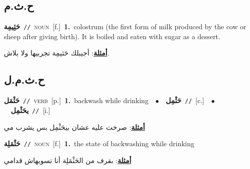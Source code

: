 \documentclass[10pt,a4paper,twoside]{article} %
\begin{document}
\begin{multicols}{2}
\vspace{-3mm}
\subsection*{\color{blue}\foreignlanguage{arabic}{ح.ث.م}\color{blue}{}} 

{\setlength\topsep{0pt}\textbf{\foreignlanguage{arabic}{حَثِيمِة}}\ {\color{gray}\texttt{//}\color{black}}\ \textsc{noun}\ [f.]\ \textbf{1.}~colostrum (the first form of milk produced by the cow or sheep after giving birth). It is boiled and eaten with sugar as a dessert.\  \begin{flushright}\color{gray}\foreignlanguage{arabic}{\textbf{\underline{\foreignlanguage{arabic}{أمثلة}}}: أجيبلك حَثيمِة تجربيها ولا بلاش.}\end{flushright}\color{black}} \vspace{2mm}

\vspace{-3mm}
\subsection*{\color{blue}\foreignlanguage{arabic}{ح.ث.م.ل}\color{blue}{}} 

{\setlength\topsep{0pt}\textbf{\foreignlanguage{arabic}{حَثْمَل}}\ {\color{gray}\texttt{//}\color{black}}\ \textsc{verb}\ [p.]\ \textbf{1.}~backwash while drinking\ \ $\bullet$\ \ \setlength\topsep{0pt}\textbf{\foreignlanguage{arabic}{حَثْمِل}}\ {\color{gray}\texttt{//}\color{black}}\ [c.]\ \ $\bullet$\ \ \setlength\topsep{0pt}\textbf{\foreignlanguage{arabic}{يحَثْمِل}}\ {\color{gray}\texttt{//}\color{black}}\ [i.]\  \begin{flushright}\color{gray}\foreignlanguage{arabic}{\textbf{\underline{\foreignlanguage{arabic}{أمثلة}}}: صرخت عليه عشان بيحَثْمِل بس يشرب مي}\end{flushright}\color{black}} \vspace{2mm}

{\setlength\topsep{0pt}\textbf{\foreignlanguage{arabic}{حَثْمَلِة}}\ {\color{gray}\texttt{//}\color{black}}\ \textsc{noun}\ [f.]\ \textbf{1.}~the state of backwashing while drinking\  \begin{flushright}\color{gray}\foreignlanguage{arabic}{\textbf{\underline{\foreignlanguage{arabic}{أمثلة}}}: بقرف من الحَثْمَلِة أنا تسويهاش قدامي}\end{flushright}\color{black}} \vspace{2mm}


\end{multicols}
\end{document}
